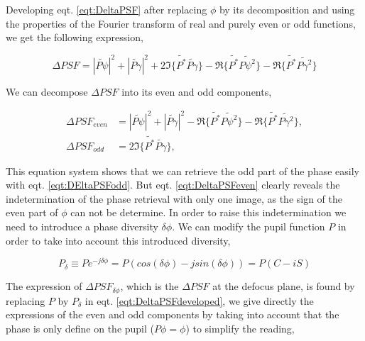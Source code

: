 Developing eqt. \eqref{eqt:DeltaPSF} after replacing $\phi$ by its decomposition and using the properties of the Fourier transform of real and purely even or odd functions, we get the following expression,

\begin{equation}
\Delta PSF = |\widetilde{P\psi}|^2 + |\widetilde{P\gamma}|^2 + 2\Im\lbrace \widetilde{P^*}\widetilde{P \gamma}\rbrace - \Re\lbrace \widetilde{P^*}\widetilde{P \psi^2}\rbrace- \Re\lbrace \widetilde{P^*}\widetilde{P \gamma^2}\rbrace
\label{eqt:DeltaPSFdeveloped}
\end{equation}

We can decompose $\Delta PSF$ into its even and odd components,

\begin{align}
\Delta PSF_{even} &= |\widetilde{P\psi}|^2 + |\widetilde{P\gamma}|^2 - \Re\lbrace \widetilde{P^*}\widetilde{P \psi^2}\rbrace- \Re\lbrace \widetilde{P^*}\widetilde{P \gamma^2}\rbrace, \label{eqt:DeltaPSFeven}\\
\Delta PSF_{odd} &= 2\Im\lbrace \widetilde{P^*}\widetilde{P \gamma}\rbrace \label{eqt:DEltaPSFodd},
\end{align}

This equation system shows that we can retrieve the odd part of the phase easily with eqt. \eqref{eqt:DEltaPSFodd}. But eqt. \eqref{eqt:DeltaPSFeven} clearly reveals the indetermination of the phase retrieval with only one image, as the sign of the even part of $\phi$ can not be determine. In order to raise this indetermination we need to introduce a phase diversity $\delta\phi$. We can modify the pupil function $P$ in order to take into account this introduced diversity,

\begin{equation}
P_{\delta} \equiv P e^{-j\delta\phi} = P(cos(\delta\phi)-jsin(\delta\phi)) = P(C-iS) 
\label{eqt:pupilDeltaphi}
\end{equation}

The expression of $\Delta PSF_{\delta\phi}$, which is the $\Delta PSF$ at the defocus plane, is found by replacing $P$ by $P_{\delta}$ in eqt. \eqref{eqt:DeltaPSFdeveloped}, we give directly the expressions of the even and odd components by taking into account that the phase is only define on the pupil ($P\phi=\phi$) to simplify the reading,

